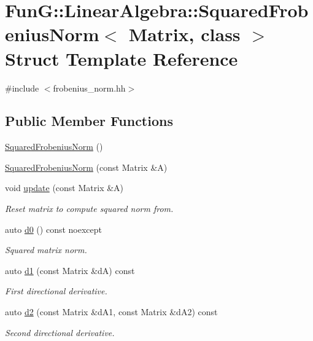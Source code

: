 \hypertarget{structFunG_1_1LinearAlgebra_1_1SquaredFrobeniusNorm}{\section{\-Fun\-G\-:\-:\-Linear\-Algebra\-:\-:\-Squared\-Frobenius\-Norm$<$ \-Matrix, class $>$ \-Struct \-Template \-Reference}
\label{structFunG_1_1LinearAlgebra_1_1SquaredFrobeniusNorm}
}


{\ttfamily \#include $<$frobenius\-\_\-norm.\-hh$>$}

\subsection*{\-Public \-Member \-Functions}
\begin{DoxyCompactItemize}
\item 
\hyperlink{structFunG_1_1LinearAlgebra_1_1SquaredFrobeniusNorm_a63abdec877dcac61101a85e5ee4a28cb}{\-Squared\-Frobenius\-Norm} ()
\item 
\hyperlink{structFunG_1_1LinearAlgebra_1_1SquaredFrobeniusNorm_af33cdb4a7282ceb03b707ff7fa85ebe4}{\-Squared\-Frobenius\-Norm} (const \-Matrix \&\-A)
\item 
void \hyperlink{structFunG_1_1LinearAlgebra_1_1SquaredFrobeniusNorm_ac4c6dbd6c3beb28d1f77b3e1367d70b6}{update} (const \-Matrix \&\-A)
\begin{DoxyCompactList}\small\item\em \-Reset matrix to compute squared norm from. \end{DoxyCompactList}\item 
auto \hyperlink{structFunG_1_1LinearAlgebra_1_1SquaredFrobeniusNorm_af0315a30be696111d572313dc16ef0f5}{d0} () const noexcept
\begin{DoxyCompactList}\small\item\em \-Squared matrix norm. \end{DoxyCompactList}\item 
auto \hyperlink{structFunG_1_1LinearAlgebra_1_1SquaredFrobeniusNorm_aba96a8b0e500268388d8dc2751188673}{d1} (const \-Matrix \&d\-A) const 
\begin{DoxyCompactList}\small\item\em \-First directional derivative. \end{DoxyCompactList}\item 
auto \hyperlink{structFunG_1_1LinearAlgebra_1_1SquaredFrobeniusNorm_a052a1615f0a6f2a0e66dba2370f7e255}{d2} (const \-Matrix \&d\-A1, const \-Matrix \&d\-A2) const 
\begin{DoxyCompactList}\small\item\em \-Second directional derivative. \end{DoxyCompactList}\end{DoxyCompactItemize}


